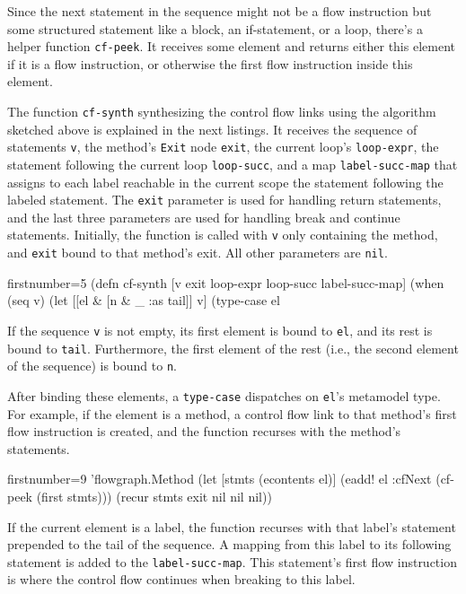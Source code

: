 \documentclass[submission]{eptcs}
\begin{document}
Since the next statement in the sequence might not be a flow instruction but
some structured statement like a block, an if-statement, or a loop, there's a
helper function \verb|cf-peek|.  It receives some element and returns either
this element if it is a flow instruction, or otherwise the first flow
instruction inside this element.

The function \verb|cf-synth| synthesizing the control flow links using the
algorithm sketched above is explained in the next listings.  It receives the
sequence of statements \verb|v|, the method's \verb|Exit| node \verb|exit|, the
current loop's \verb|loop-expr|, the statement following the current loop
\verb|loop-succ|, and a map \verb|label-succ-map| that assigns to each label
reachable in the current scope the statement following the labeled statement.
The \verb|exit| parameter is used for handling return statements, and the last
three parameters are used for handling break and continue statements.
Initially, the function is called with \verb|v| only containing the method, and
\verb|exit| bound to that method's exit.  All other parameters are \verb|nil|.

\begin{clojurecode*}{firstnumber=5}
(defn cf-synth [v exit loop-expr loop-succ label-succ-map]
  (when (seq v)
    (let [[el & [n & _ :as tail]] v]
      (type-case el
\end{clojurecode*}

If the sequence \verb|v| is not empty, its first element is bound to \verb|el|,
and its rest is bound to \verb|tail|.  Furthermore, the first element of the
rest (i.e., the second element of the sequence) is bound to \verb|n|.

After binding these elements, a \verb|type-case| dispatches on \verb|el|'s
metamodel type.  For example, if the element is a method, a control flow link
to that method's first flow instruction is created, and the function recurses
with the method's statements.

\begin{clojurecode*}{firstnumber=9}
        'flowgraph.Method (let [stmts (econtents el)]
                            (eadd! el :cfNext (cf-peek (first stmts)))
                            (recur stmts exit nil nil nil))
\end{clojurecode*}

If the current element is a label, the function recurses with that label's
statement prepended to the tail of the sequence.  A mapping from this label to
its following statement is added to the \verb|label-succ-map|.  This
statement's first flow instruction is where the control flow continues when
breaking to this label.
\end{document}
